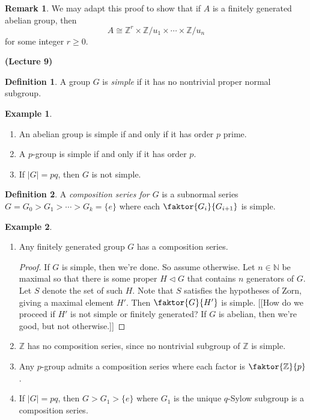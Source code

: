 \documentclass[10pt,letterpaper,cm]{nupset}
\theoremstyle{definition}
\newtheorem*{definition}{Definition}
\newtheorem{exmp}{Example}
\newtheorem{remark}{Remark}
\newcommand{\N}{\mathbb N}
\newcommand{\Z}{\mathbb Z}
\newcommand{\1}{\mathbf{1}}
\newcommand{\0}{\vec 0}
\begin{document}
\begin{remark}
We may adapt this proof to show that if $A$ is a finitely generated abelian group, then $$A \cong \Z^r \times \Z/u_1 \times \cdots \times \Z/u_n$$ for some integer $r\geq 0$. 
\end{remark}

\begin{center}
 {\textbf{(Lecture 9)}}
\end{center}

\begin{definition}
A group $G$ is \textit{simple} if it has no nontrivial proper normal subgroup.
\end{definition}

\begin{exmp} $ $
\begin{enumerate}
\item An abelian group is simple if and only if it has order $p$ prime.
\item A $p$-group is simple if and only if it has order $p$.
\item If $|G| = pq$, then $G$ is not simple.
\end{enumerate}
\end{exmp}

\begin{definition}
A \textit{composition series for $G$} is a subnormal series $G = G_0 > G_1 > \cdots > G_k = \{e\}$ where each $\faktor{G_i}{G_{i+1}}$ is simple.
\end{definition}

\begin{exmp} $ $
\begin{enumerate}
\item Any finitely generated group $G$ has a composition series.
\begin{proof}
If $G$ is simple, then we're done. So assume otherwise. Let $n\in \N$ be maximal so that there is some proper $H \lhd G$ that contains $n$ generators of $G$. Let $S$ denote the set of such $H$. Note that $S$ satisfies the hypotheses of Zorn, giving a maximal element $H'$. Then $\faktor{G}{H'}$ is simple. {[[How do we proceed if $H'$ is not simple or finitely generated? If $G$ is abelian, then we're good, but not otherwise.]]}
\end{proof}
\item $\Z$ has no composition series, since no nontrivial subgroup of $\Z$ is simple.
\item Any $p$-group admits a composition series where each factor is $\faktor{\Z}{p}$.
\item If $|G|= pq$, then $G > G_1 > \{e\}$ where $G_1$ is the unique $q$-Sylow subgroup is a composition series.
\end{enumerate}
\end{exmp}
\end{document}
